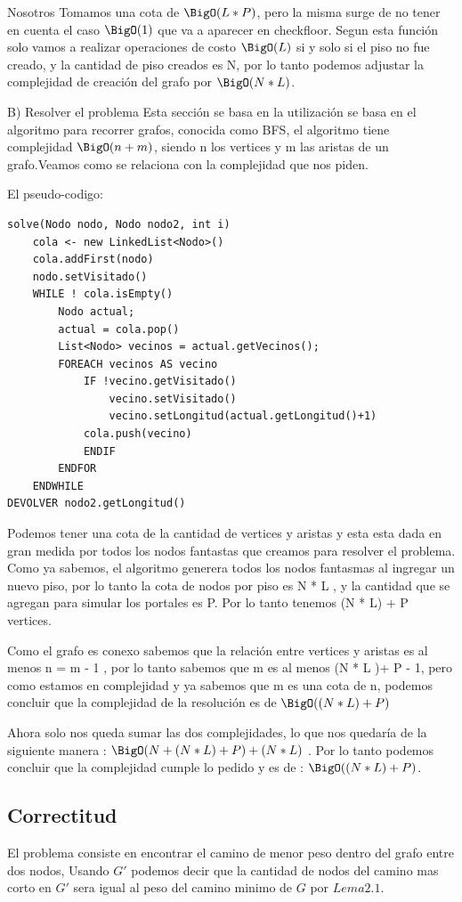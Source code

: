 Nosotros Tomamos una cota de $\BigO(L * P)$, pero la misma surge de no tener en cuenta el caso $\BigO(1)$ que va a aparecer en checkfloor. Segun esta funci\'on solo vamos a realizar operaciones de costo $\BigO(L)$ si y solo si el piso no fue creado, y la cantidad de piso creados es N, por lo tanto podemos adjustar la complejidad de creaci\'on del grafo por $\BigO(N * L)$.

B) Resolver el problema
Esta secci\'on se basa en la utilizaci\'on se basa en el algoritmo para recorrer grafos, conocida como BFS, el algoritmo tiene complejidad $\BigO(n + m)$, siendo n los vertices y m las aristas de un grafo.Veamos como se relaciona con la complejidad que nos piden.

\pagebreak

El pseudo-codigo:
\begin{lstlisting}
solve(Nodo nodo, Nodo nodo2, int i) 
	cola <- new LinkedList<Nodo>()
	cola.addFirst(nodo)
	nodo.setVisitado()
	WHILE ! cola.isEmpty()
        Nodo actual;
        actual = cola.pop()
        List<Nodo> vecinos = actual.getVecinos();		
        FOREACH vecinos AS vecino
            IF !vecino.getVisitado()
                vecino.setVisitado()
                vecino.setLongitud(actual.getLongitud()+1)
			cola.push(vecino)
	        ENDIF
     	ENDFOR
    ENDWHILE
DEVOLVER nodo2.getLongitud()
\end{lstlisting}

Podemos tener una cota de la cantidad de vertices y aristas y esta esta dada en gran medida por todos los nodos fantastas que creamos para resolver el problema. Como ya sabemos, el algoritmo generera todos los nodos fantasmas al ingregar un nuevo piso, por lo tanto la cota de nodos por piso es N * L , y la cantidad que se agregan para simular los portales es P. Por lo tanto tenemos (N * L) + P vertices. 

Como el grafo es conexo sabemos que la relaci\'on entre vertices y aristas es al menos n = m - 1 , por lo tanto sabemos que m es al menos (N * L )+ P - 1, pero como estamos en complejidad y ya sabemos que m es una cota de n, podemos concluir que la complejidad de la resoluci\'on es de $\BigO((N * L) + P)$

Ahora solo nos queda sumar las dos complejidades, lo que nos quedar\'ia de la siguiente manera : $\BigO(N + (N * L) + P) + (N * L)$ .
Por lo tanto podemos concluir que la complejidad cumple lo pedido y es de : $\BigO((N * L) + P)$.

\pagebreak
\subsection{Correctitud}
    El problema consiste en encontrar el camino de menor peso dentro del grafo entre dos nodos, Usando $G'$ podemos decir que la cantidad de nodos del camino mas corto en $G'$ sera igual al peso del camino minimo de $G$ por $Lema 2.1$. \endl
    
